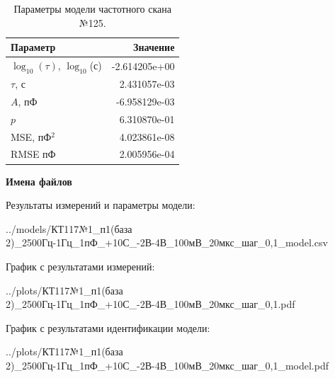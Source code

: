 \begin{table}[!ht]
    \centering
    \caption{Параметры модели частотного скана №125.}
    \begin{tabular}{|l|r|}
        \hline
        Параметр                                       & Значение                  \\ \hline
        $\log_{10}(\tau)$, $\log_{10}$(с)              & -2.614205e+00             \\ \hline
        $\tau$, с                                      & 2.431057e-03              \\ \hline
        $A$, пФ                                        & -6.958129e-03             \\ \hline
        $p$                                            & 6.310870e-01              \\ \hline
        MSE, пФ$^2$                                    & 4.023861e-08              \\ \hline
        RMSE пФ                                        & 2.005956e-04              \\ \hline
    \end{tabular}
    \label{table:frequency_scan_model_125}
\end{table}

\textbf{Имена файлов}

Результаты измерений и параметры модели:

\scriptsize../models/КТ117№1\_п1(база 2)\_2500Гц-1Гц\_1пФ\_+10С\_-2В-4В\_100мВ\_20мкс\_шаг\_0,1\_model.csv
\normalsize

График с результатами измерений:

\scriptsize../plots/КТ117№1\_п1(база 2)\_2500Гц-1Гц\_1пФ\_+10С\_-2В-4В\_100мВ\_20мкс\_шаг\_0,1.pdf
\normalsize

График с результатами идентификации модели:

\scriptsize../plots/КТ117№1\_п1(база 2)\_2500Гц-1Гц\_1пФ\_+10С\_-2В-4В\_100мВ\_20мкс\_шаг\_0,1\_model.pdf
\normalsize

